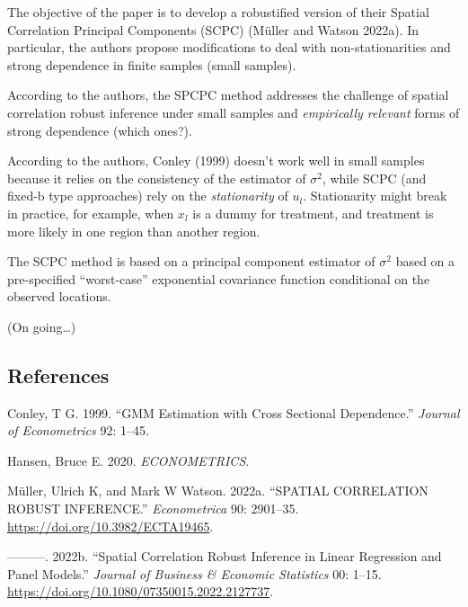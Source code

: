 \documentclass[
]{article}
\newlength{\cslhangindent}
\newlength{\cslentryspacingunit} %
\newenvironment{CSLReferences}[2] %
 {%
  \setlength{\parindent}{0pt}
  \ifodd #1
  \let\oldpar\par
  \def\par{\hangindent=\cslhangindent\oldpar}
  \fi
  \setlength{\parskip}{#2\cslentryspacingunit}
 }%
 {}
\begin{document}
The objective of the paper is to develop a robustified version of their
Spatial Correlation Principal Components (SCPC) (Müller and Watson
2022a). In particular, the authors propose modifications to deal with
non-stationarities and strong dependence in finite samples (small
samples).

According to the authors, the SPCPC method addresses the challenge of
spatial correlation robust inference under small samples and
\emph{empirically relevant} forms of strong dependence (which ones?).

According to the authors, Conley (1999) doesn't work well in small
samples because it relies on the consistency of the estimator of
\(\sigma^2\), while SCPC (and fixed-b type approaches) rely on the
\emph{stationarity} of \(u_l\). Stationarity might break in practice,
for example, when \(x_l\) is a dummy for treatment, and treatment is
more likely in one region than another region.

The SCPC method is based on a principal component estimator of
\(\sigma^2\) based on a pre-specified ``worst-case'' exponential
covariance function conditional on the observed locations.

(On going\ldots)

\hypertarget{references}{%
\subsection*{References}\label{references}}

\hypertarget{refs}{}
\begin{CSLReferences}{1}{0}
\leavevmode{}%
Conley, T G. 1999. {``GMM Estimation with Cross Sectional Dependence.''}
\emph{Journal of Econometrics} 92: 1--45.

\leavevmode{}%
Hansen, Bruce E. 2020. \emph{ECONOMETRICS}.

\leavevmode{}%
Müller, Ulrich K, and Mark W Watson. 2022a. {``SPATIAL CORRELATION
ROBUST INFERENCE.''} \emph{Econometrica} 90: 2901--35.
\url{https://doi.org/10.3982/ECTA19465}.

\leavevmode{}%
---------. 2022b. {``Spatial Correlation Robust Inference in Linear
Regression and Panel Models.''} \emph{Journal of Business \& Economic
Statistics} 00: 1--15.
\url{https://doi.org/10.1080/07350015.2022.2127737}.

\end{CSLReferences}
\end{document}
